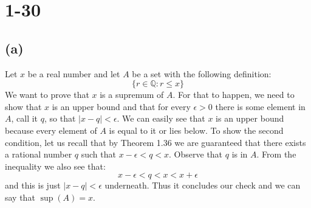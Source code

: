 \documentclass{article}
\begin{document}
\section*{1-30}
\subsection*{(a)}
Let \(x\) be a real number and let \(A\) be a set with the following definition:
\begin{equation*}
    \{r \in \mathbb{Q} : r \leq x\}
\end{equation*}
We want to prove that \(x\) is a supremum of \(A\). For that to happen, we need to show that \(x\) is an upper bound
and that for every \(\epsilon > 0\) there is some element in \(A\), call it \(q\), so that \(|x - q| < \epsilon\).
We can easily see that \(x\) is an upper bound because every element of \(A\) is equal to it or lies below.
To show the second condition, let us recall that by Theorem 1.36 we are guaranteed that there exists a rational
number \(q\) such that \(x - \epsilon < q < x\). Observe that \(q\) is in \(A\). From the inequality we also see that:
\begin{equation*}
    x - \epsilon < q < x < x + \epsilon
\end{equation*}
and this is just \(|x - q| < \epsilon\) underneath. Thus it concludes our check and we can say that \(\sup(A) = x\).
\end{document}
